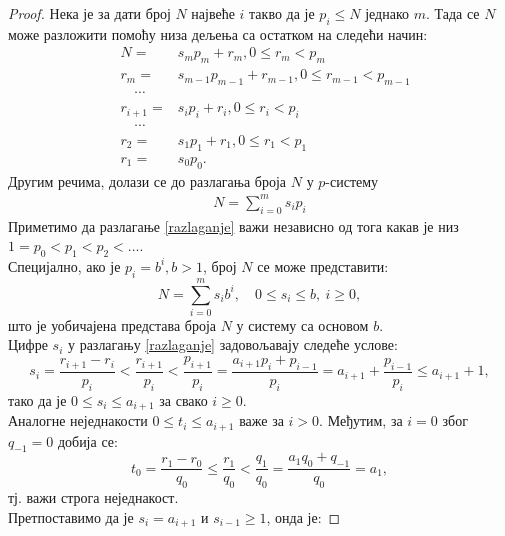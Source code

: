 \documentclass[a4paper]{article}
\begin{document}
\begin{proof}
	Нека је за дати број $ N $ највеће $ i $ такво да је $ p_{i} \leq N $ једнако $ m $. Тада се $ N $ може разложити помоћу низа дељења са остатком на следећи начин:
		\begin{eqnarray*}
			&N = &s_{m}p_{m} + r_{m}, 0 \leq r_{m} < p_{m}\\
			&r_{m} = &s_{m-1}p_{m-1} + r_{m-1}, 0 \leq r_{m-1} < p_{m-1}\\
			& \quad \cdots&\\
			&r_{i+1} = &s_{i}p_{i} + r_{i}, 0 \leq r_{i} < p_{i}\\
			& \quad \cdots&\\
			&r_{2} =& s_{1}p_{1} + r_{1}, 0 \leq r_{1} < p_{1}\\
			&r_{1} =& s_{0}p_{0}. 
		\end{eqnarray*}
	Другим речима, долази се до разлагања броја $ N $ у $ p $-систему 
		\begin{eqnarray}
			 \label{razlaganje} N = \sum_{i=0}^{m} s_{i}p_{i} 
		\end{eqnarray}
	Приметимо да разлагање \eqref{razlaganje} важи независно од тога какав је низ $ 1 = p_{0} < p_{1} < p_{2} < \ldots $.\\
	Специјално, ако је $ p_{i} = b^{i}, b > 1 $, број $ N $ се може представити:
		\begin{displaymath}
			N = \sum_{i=0}^{m} s_{i}b^{i},\quad 0 \leq s_{i} \le b,\ i \geq 0,
		\end{displaymath}
	што је уобичајена представа броја $ N $ у систему са основом $ b $.\\
	Цифре $ s_{i} $ у разлагању \eqref{razlaganje} задовољавају следеће услове:	
		\begin{displaymath}
			s_{i} = \frac{r_{i+1} - r_{i}}{p_{i}} < \frac{r_{i+1}}{p_{i}} < \frac{p_{i+1}}{p_{i}} = \frac{a_{i+1}p_{i}+p_{i-1}}{p_{i}} = a_{i+1} + \frac{p_{i-1}}{p_{i}} \leq a_{i+1} + 1, 
		\end{displaymath} 	 
	тако да је $ 0 \leq s_{i} \leq a_{i+1} $ за свако $ i \geq 0 $.\\
	Аналогне неједнакости $ 0 \le t_{i} \le a_{i+1} $ важе за $ i > 0 $. Међутим, за $ i = 0 $ због $ q_{-1} = 0 $ добија се:
		\begin{displaymath} 
			t_0=\frac{r_1-r_0}{q_0}\le \frac{r_1}{q_0} < \frac{q_1}{q_0}=
			\frac{a_1 q_0+q_{-1}}{q_0}=a_1,
		\end{displaymath}
	тј. важи строга неједнакост.\\
	Претпоставимо да је $ s_{i} = a_{i+1} $ и $ s_{i-1} \geq 1 $, онда је: 

\end{proof}
\end{document}
